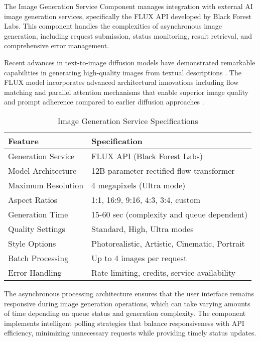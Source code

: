 The Image Generation Service Component manages integration with external AI image generation services, specifically the FLUX API developed by Black Forest Labs. This component handles the complexities of asynchronous image generation, including request submission, status monitoring, result retrieval, and comprehensive error management.

Recent advances in text-to-image diffusion models have demonstrated remarkable capabilities in generating high-quality images from textual descriptions \cite{yang2023text, saharia2022photorealistic}. The FLUX model incorporates advanced architectural innovations including flow matching and parallel attention mechanisms that enable superior image quality and prompt adherence compared to earlier diffusion approaches \cite{liang2024rich}.

\begin{table}[H]
\centering
\caption{Image Generation Service Specifications}
\label{tab:imggen_specifications}
{\begin{tabular}{ll}
\toprule
\textbf{Feature} & \textbf{Specification} \\
\midrule
Generation Service & FLUX API (Black Forest Labs) \\
Model Architecture & 12B parameter rectified flow transformer \\
Maximum Resolution & 4 megapixels (Ultra mode) \\
Aspect Ratios & 1:1, 16:9, 9:16, 4:3, 3:4, custom \\
Generation Time & 15-60 sec (complexity and queue dependent) \\
Quality Settings & Standard, High, Ultra modes \\
Style Options & Photorealistic, Artistic, Cinematic, Portrait \\
Batch Processing & Up to 4 images per request \\
Error Handling & Rate limiting, credits, service availability \\
\bottomrule
\end{tabular}}
\end{table}

The asynchronous processing architecture ensures that the user interface remains responsive during image generation operations, which can take varying amounts of time depending on queue status and generation complexity. The component implements intelligent polling strategies that balance responsiveness with API efficiency, minimizing unnecessary requests while providing timely status updates.

